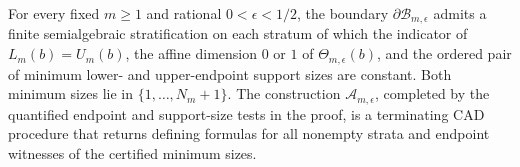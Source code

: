 For every fixed \(m\geq1\) and rational \(0<\epsilon<1/2\), the boundary \(\partial\mathcal B_{m,\epsilon}\) admits a finite semialgebraic stratification on each stratum of which the indicator of \(L_m(b)=U_m(b)\), the affine dimension \(0\) or \(1\) of \(\Theta_{m,\epsilon}(b)\), and the ordered pair of minimum lower- and upper-endpoint support sizes are constant.  Both minimum sizes lie in \(\{1,\ldots,N_m+1\}\).  The construction \(\mathcal A_{m,\epsilon}\), completed by the quantified endpoint and support-size tests in the proof, is a terminating CAD procedure that returns defining formulas for all nonempty strata and endpoint witnesses of the certified minimum sizes.